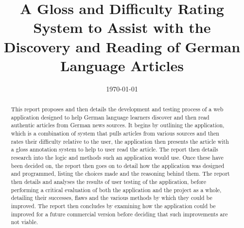 \documentclass{ecsreport}
\begin{document}
\frontmatter
\title      {A Gloss and Difficulty Rating System to Assist with the Discovery and Reading of German Language Articles}
\addresses  {\groupname\\\deptname\\\univname}
\date       {\today}
\subject    {}
\keywords   {}
\maketitle
\begin{abstract}
	
This report proposes and then details the development and testing process of a web application designed to help German language learners discover and then read authentic articles from German news sources. It begins by outlining the application, which is a combination of system that pulls articles from various sources and then rates their difficulty relative to the user, the application then presents the article with a gloss annotation system to help to user read the article. The report then details research into the logic and methods such an application would use. Once these have been decided on, the report then goes on to detail how the application was designed and programmed, listing the choices made and the reasoning behind them. The report then details and analyses the results of user testing of the application, before performing a critical evaluation of both the application and the project as a whole, detailing their successes, flaws and the various methods by which they could be improved. The report then concludes by examining how the application could be improved for a future commercial version before deciding that such improvements are not viable.	 
	
\end{abstract}
\tableofcontents
\listoffigures
\listoftables
\lstlistoflistings
\mainmatter
\appendix




\backmatter
%
%
\printbibliography
\end{document}
